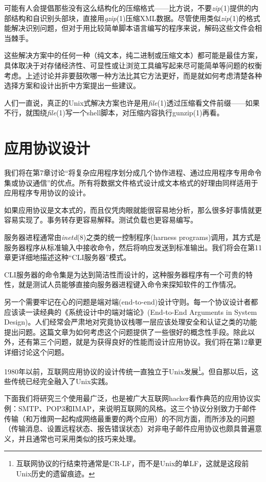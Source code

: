 \documentclass[12pt,oneside]{book}
\begin{document}
\begin{common-format}
可能有人会提倡那些没有这么结构化的压缩格式——比方说，不要\textit{zip}(1)提供的内部结构和自识别头部块，直接用\textit{gzip}(1)压缩XML数据。尽管使用类似\textit{zip}(1)的格式能解决识别问题，但对于用比较简单脚本语言编写的程序来说，解码这些文件会相当棘手。

这些解决方案中的任何一种（纯文本，纯二进制或压缩文本）都可能是最佳方案，具体取决于对存储经济性、可显性或让浏览工具编写起来尽可能简单等问题的权衡考虑。上述讨论并非要鼓吹哪一种方法比其它方法更好，而是就如何考虑清楚各种选择方案和设计出折中方案提出一些建议。

人们一直说，真正的Unix式解决方案也许是用\textit{file}(1)透过压缩看文件前缀——如果不行，就围绕\textit{file}(1)写一个shell脚本，对压缩内容执行gunzip(1)再看。


\section{应用协议设计}
我们将在第7章讨论“将复杂应用程序划分成几个协作进程、通过应用程序专用命令集或协议通信”的优点。所有将数据文件格式设计成文本格式的好理由同样适用于应用程序专用协议的设计。

如果应用协议是文本式的，而且仅凭肉眼就能很容易地分析，那么很多好事情就更容易实现了。事务转存更容易解释。测试负载也更容易编写。

服务器进程通常由\textit{inetd}(8)之类的统一控制程序(harness programs)调用，其方式是服务器程序从标准输入中接收命令，然后将响应发送到标准输出。我们将会在第11章更详细地描述这种“CLI服务器”模式。

CLI服务器的命令集是为达到简洁性而设计的，这种服务器程序有一个可贵的特性，就是测试人员能够直接向服务器进程键入命令来探知软件的工作情况。

另一个需要牢记在心的问题是端对端(end-to-end)设计守则。每一个协议设计者都应该读一读经典的《系统设计中的端对端论》(End-to-End Arguments in System Design)\cite{Saltzer}。人们经常会严肃地对究竟协议栈哪一层应该处理安全和认证之类的功能提出问题。这篇文章为如何考虑这个问题提供了一些很好的概念性手段。除此以外，还有第三个问题，就是为获得良好的性能而设计应用协议。我们将在第12章更详细讨论这个问题。

1980年以前，互联网应用协议的设计传统一直独立于Unix发展\footnote{互联网协议的行结束符通常是CR-LF，而不是Unix的单LF，这就是这段前Unix历史的遗留痕迹。}。但自那以后，这些传统已经完全融入了Unix实践。

下面我们将研究三个使用最广泛，也是被广大互联网hacker看作典范的应用协议实例：SMTP、POP3和IMAP，来说明互联网的风格。这三个协议分别致力于邮件传输（和万维网一起构成网络最重要的两个应用）的不同方面，而所涉及的问题（传输消息、设置远程状态、报告错误状态）对非电子邮件应用协议也颇具普遍意义，并且通常也可采用类似的技巧来处理。




\end{common-format}
\end{document}
